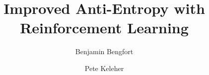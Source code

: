 \documentclass[sigconf]{acmart}
\begin{document}
\title{Improved Anti-Entropy with Reinforcement Learning}

\author{Benjamin Bengfort}

\author{Pete Keleher}


\begin{abstract}
    
\end{abstract}

\maketitle





\end{document}
